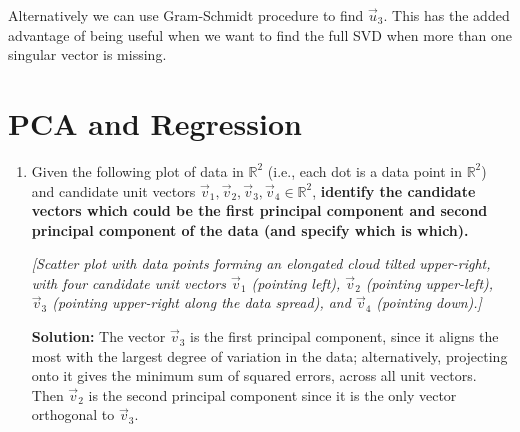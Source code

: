\documentclass[10pt]{article}
\newcommand{\RR}{\mathbb{R}}
\begin{document}
\begin{enumerate}[label=(\alph*)]
Alternatively we can use Gram-Schmidt procedure to find $\vec{u}_3$. This has the added advantage of being useful when we want to find the full SVD when more than one singular vector is missing.

\end{enumerate}

\section{PCA and Regression}

\begin{enumerate}[label=(\alph*)]
\item Given the following plot of data in $\RR^2$ (i.e., each dot is a data point in $\RR^2$) and candidate unit vectors $\vec{v}_1, \vec{v}_2, \vec{v}_3, \vec{v}_4 \in \RR^2$, \textbf{identify the candidate vectors which could be the first principal component and second principal component of the data (and specify which is which).}

\begin{center}
\emph{[Scatter plot with data points forming an elongated cloud tilted upper-right, with four candidate unit vectors $\vec{v}_1$ (pointing left), $\vec{v}_2$ (pointing upper-left), $\vec{v}_3$ (pointing upper-right along the data spread), and $\vec{v}_4$ (pointing down).]}
\end{center}

\textbf{Solution:} The vector $\vec{v}_3$ is the first principal component, since it aligns the most with the largest degree of variation in the data; alternatively, projecting onto it gives the minimum sum of squared errors, across all unit vectors. Then $\vec{v}_2$ is the second principal component since it is the only vector orthogonal to $\vec{v}_3$.


\end{enumerate}
\end{document}
